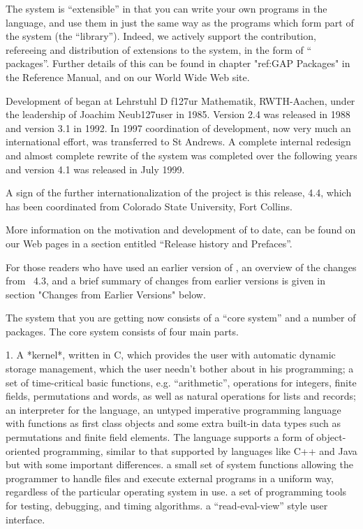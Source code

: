 The system is ``extensible'' in that you can write your own  programs  in
the {\GAP} language, and use them in just the same way  as  the  programs
which form part of the system  (the  ``library'').  Indeed,  we  actively
support the contribution, refereeing and distribution  of  extensions  to
the system, in the form of ``{\GAP} packages''.  Further details of  this
can be found in chapter "ref:GAP Packages" in the Reference Manual, and
on our World Wide Web site.

Development of {\GAP} began at Lehrstuhl D f\accent127ur Mathematik,
RWTH-Aachen, under the leadership of Joachim Neub\accent127user
in 1985. Version 2.4 was released in 1988 and version 3.1 in 1992.
In 1997 coordination of 
{\GAP} development, now very much an international effort, was
transferred to St Andrews.  A complete internal redesign and almost
complete rewrite of the system was completed over the following years and
version 4.1 was released in July 1999.

A sign of the further internationalization of the project is this release,
4.4, which has been coordinated from Colorado State University, Fort Collins.

More information on the motivation and development of {\GAP} to date,
can be found on our Web pages in a section entitled ``Release history
and Prefaces''.

For those readers who have used an earlier version of {\GAP}, an
overview of the changes from {\GAP}~4.3, and a brief summary of
changes from earlier versions is given in section "Changes from Earlier
Versions" below.

The system that you are getting now consists of a ``core system'' and
a number of packages. The core system consists of four main parts.
\beginlist%
  \item{1.}
    A  *kernel*, written in C, which provides the user with
    \itemitem{--}%
      automatic dynamic storage management, which the user needn't bother
      about in his programming;
    \itemitem{--}
      a   set of  time-critical basic   functions, e.g.   ``arithmetic'',
      operations for integers, finite fields,  permutations and words, as
      well as natural operations for lists and records;
    \itemitem{--} 
      an interpreter   for  the {\GAP} language,    an untyped
      imperative programming language with functions as first class objects
      and some extra built-in data types such as permutations and finite
      field elements.  The language supports a form of object-oriented
      programming, similar to that supported by languages like C++ and
      Java but with some important differences.
    \itemitem{--}
      a small set of system functions allowing the {\GAP} programmer to handle
      files and execute external programs in a uniform way, regardless of 
      the particular operating system in use. 
    \itemitem{--}
      a  set  of programming tools  for   testing, debugging, and timing
      algorithms.
    \itemitem{--}
      a ``read-eval-view'' style user interface.

